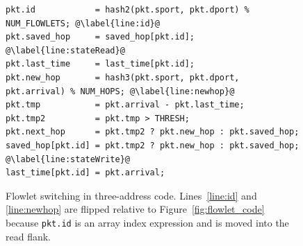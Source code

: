 \begin{figure}[!t]
\begin{minipage}{\textwidth}
\begin{lstlisting}[style=customc]
pkt.id            = hash2(pkt.sport, pkt.dport) % NUM_FLOWLETS; @\label{line:id}@
pkt.saved_hop     = saved_hop[pkt.id]; @\label{line:stateRead}@
pkt.last_time     = last_time[pkt.id];
pkt.new_hop       = hash3(pkt.sport, pkt.dport, pkt.arrival) % NUM_HOPS; @\label{line:newhop}@
pkt.tmp           = pkt.arrival - pkt.last_time;
pkt.tmp2          = pkt.tmp > THRESH;
pkt.next_hop      = pkt.tmp2 ? pkt.new_hop : pkt.saved_hop;
saved_hop[pkt.id] = pkt.tmp2 ? pkt.new_hop : pkt.saved_hop; @\label{line:stateWrite}@
last_time[pkt.id] = pkt.arrival;
\end{lstlisting}
\caption[title2]{Flowlet switching in three-address
code. Lines~\ref{line:id} and \ref{line:newhop} are flipped relative
to Figure~\ref{fig:flowlet_code} because {\tt pkt.id} is an array index expression and is
moved into the read flank.}
\label{fig:three_address}
\end{minipage}
\vspace{-0.3cm}
\end{figure}

